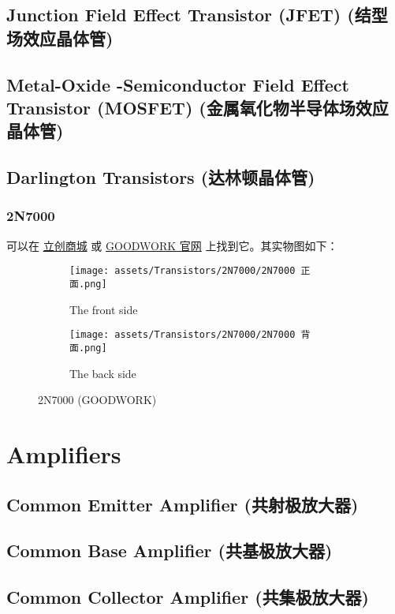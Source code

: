 \documentclass[UTF8]{report}
\begin{document}
\section{Junction Field Effect Transistor (JFET) (结型场效应晶体管)}
\section{Metal-Oxide -Semiconductor Field Effect Transistor (MOSFET) (金属氧化物半导体场效应晶体管)}
\section{Darlington Transistors (达林顿晶体管)}

\subsection{2N7000}

可以在 \href{https://item.szlcsc.com/232636.html}{立创商城} 或  \href{https://www.GOODWORK.com/products/discrete-power-modules/mosfets/small-signal-mosfets/1N4007}{GOODWORK 官网} 上找到它。其实物图如下：

\begin{figure}[H]\centering
    \begin{subfigure}[b]{0.5\columnwidth}\centering
        \texttt{[image: assets/Transistors/2N7000/2N7000 正面.png]}
        \caption{The front side}
    \end{subfigure}\hfill
    \begin{subfigure}[b]{0.5\columnwidth}\centering
        \texttt{[image: assets/Transistors/2N7000/2N7000 背面.png]}
        \caption{The back side}
    \end{subfigure}
    \caption{2N7000 (GOODWORK)}
    \end{figure}

\chapter{Amplifiers}\thispagestyle{fancy}
\section{Common Emitter Amplifier (共射极放大器)}
\section{Common Base Amplifier (共基极放大器)}
\section{Common Collector Amplifier (共集极放大器)}
\end{document}

